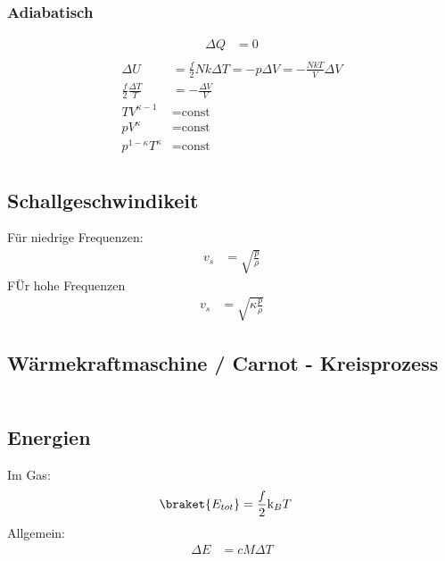 \documentclass[11pt,letterpaper]{article}
\begin{document}
{{{    \subsubsection{Adiabatisch}
    {
        \begin{align*}
            \Delta Q &= 0\\
        \end{align*}
        \begin{align*}
            \Delta U &= \frac{f}{2} N k \Delta T = -p \Delta V = -\frac{N k T }{V} \Delta V\\
            \frac{f}{2} \frac{\Delta T}{T} &= - \frac{\Delta V }{V}\\
             T V ^{\kappa -1} &=  \text{const}\\
            p V ^{\kappa } &=  \text{const}\\
            p^{1-\kappa} T ^{\kappa} &=  \text{const}\\
        \end{align*}
    }
}

\subsection{Schallgeschwindikeit}
{
    Für niedrige Frequenzen:
    \begin{align*}
        v_s &= \sqrt{\frac{p}{\rho}}
    \end{align*}
    FÜr hohe Frequenzen
    \begin{align*}
        v_s &= \sqrt{\kappa \frac{p}{\rho}}
    \end{align*}
}

\subsection{Wärmekraftmaschine / Carnot - Kreisprozess}
{
    \begin{align*}
    \end{align*}
}

\subsection{Energien}
{
    Im Gas:
    \begin{align*}
        \braket{E_{tot}} &= \frac{f}{2}\mathrm{k}_B T
    \end{align*}
    Allgemein:
    \begin{align*}
        \Delta  E &= c M\Delta T
    \end{align*}

}}}
\end{document}
